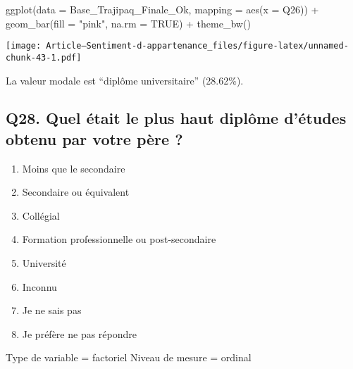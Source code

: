 \documentclass[
]{article}
\newenvironment{Shaded}{\begin{snugshade}}{\end{snugshade}}
\newcommand{\AttributeTok}[1]{\textcolor[rgb]{0.77,0.63,0.00}{#1}}
\newcommand{\ConstantTok}[1]{\textcolor[rgb]{0.00,0.00,0.00}{#1}}
\newcommand{\FunctionTok}[1]{\textcolor[rgb]{0.00,0.00,0.00}{#1}}
\newcommand{\NormalTok}[1]{#1}
\newcommand{\SpecialCharTok}[1]{\textcolor[rgb]{0.00,0.00,0.00}{#1}}
\newcommand{\StringTok}[1]{\textcolor[rgb]{0.31,0.60,0.02}{#1}}
\providecommand{\tightlist}{%
  \setlength{\itemsep}{0pt}\setlength{\parskip}{0pt}}
\begin{document}
\begin{Shaded}
\begin{Highlighting}[]
\FunctionTok{ggplot}\NormalTok{(}\AttributeTok{data =}\NormalTok{ Base\_Trajipaq\_Finale\_Ok, }\AttributeTok{mapping =} \FunctionTok{aes}\NormalTok{(}\AttributeTok{x =}\NormalTok{ Q26)) }\SpecialCharTok{+}
  \FunctionTok{geom\_bar}\NormalTok{(}\AttributeTok{fill =} \StringTok{"pink"}\NormalTok{, }\AttributeTok{na.rm =} \ConstantTok{TRUE}\NormalTok{) }\SpecialCharTok{+}
  \FunctionTok{theme\_bw}\NormalTok{()}
\end{Highlighting}
\end{Shaded}

\texttt{[image: Article---Sentiment-d-appartenance\_files/figure-latex/unnamed-chunk-43-1.pdf]}

La valeur modale est ``diplôme universitaire'' (28.62\%).

\hypertarget{q28.-quel-uxe9tait-le-plus-haut-dipluxf4me-duxe9tudes-obtenu-par-votre-puxe8re}{%
\subsection{Q28. Quel était le plus haut diplôme d'études obtenu par
votre père
?}\label{q28.-quel-uxe9tait-le-plus-haut-dipluxf4me-duxe9tudes-obtenu-par-votre-puxe8re}}

\begin{enumerate}
\def\labelenumi{\arabic{enumi}.}
\tightlist
\item
  Moins que le secondaire
\item
  Secondaire ou équivalent
\item
  Collégial
\item
  Formation professionnelle ou post-secondaire
\item
  Université
\item
  Inconnu
\item
  Je ne sais pas
\item
  Je préfère ne pas répondre
\end{enumerate}

Type de variable = factoriel Niveau de mesure = ordinal
\end{document}
